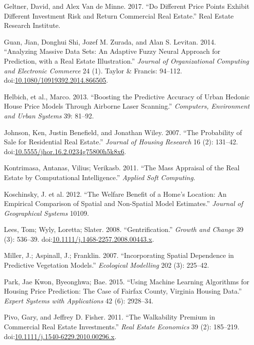 \documentclass[]{article}
\begin{document}
\hypertarget{ref-Geltner2017}{}
Geltner, David, and Alex Van de Minne. 2017. ``Do Different Price Points
Exhibit Different Investment Risk and Return Commercial Real Estate.''
Real Estate Research Institute.

\hypertarget{ref-Guan2014}{}
Guan, Jian, Donghui Shi, Jozef M. Zurada, and Alan S. Levitan. 2014.
``Analyzing Massive Data Sets: An Adaptive Fuzzy Neural Approach for
Prediction, with a Real Estate Illustration.'' \emph{Journal of
Organizational Computing and Electronic Commerce} 24 (1). Taylor \&
Francis: 94--112.
doi:\href{https://doi.org/10.1080/10919392.2014.866505}{10.1080/10919392.2014.866505}.

\hypertarget{ref-Helbich2013}{}
Helbich, et al., Marco. 2013. ``Boosting the Predictive Accuracy of
Urban Hedonic House Price Models Through Airborne Laser Scanning.''
\emph{Computers, Environment and Urban Systems} 39: 81--92.

\hypertarget{ref-Johnson2007}{}
Johnson, Ken, Justin Benefield, and Jonathan Wiley. 2007. ``The
Probability of Sale for Residential Real Estate.'' \emph{Journal of
Housing Research} 16 (2): 131--42.
doi:\href{https://doi.org/10.5555/jhor.16.2.0234g75800h5k8x6}{10.5555/jhor.16.2.0234g75800h5k8x6}.

\hypertarget{ref-Kontrimasa2011}{}
Kontrimasa, Antanas, Vilius; Verikasb. 2011. ``The Mass Appraisal of the
Real Estate by Computational Intelligence.'' \emph{Applied Soft
Computing}.

\hypertarget{ref-Koschinsky2012}{}
Koschinsky, J. et al. 2012. ``The Welfare Benefit of a Home's Location:
An Empirical Comparison of Spatial and Non-Spatial Model Estimates.''
\emph{Journal of Geographical Systems} 10109.

\hypertarget{ref-Lees2008}{}
Lees, Tom; Wyly, Loretta; Slater. 2008. ``Gentrification.'' \emph{Growth
and Change} 39 (3): 536--39.
doi:\href{https://doi.org/10.1111/j.1468-2257.2008.00443.x}{10.1111/j.1468-2257.2008.00443.x}.

\hypertarget{ref-Miller2015}{}
Miller, J.; Aspinall, J.; Franklin. 2007. ``Incorporating Spatial
Dependence in Predictive Vegetation Models.'' \emph{Ecological
Modelling} 202 (3): 225--42.

\hypertarget{ref-Park2015}{}
Park, Jae Kwon, Byeonghwa; Bae. 2015. ``Using Machine Learning
Algorithms for Housing Price Prediction: The Case of Fairfax County,
Virginia Housing Data.'' \emph{Expert Systems with Applications} 42 (6):
2928--34.

\hypertarget{ref-Pivo2011}{}
Pivo, Gary, and Jeffrey D. Fisher. 2011. ``The Walkability Premium in
Commercial Real Estate Investments.'' \emph{Real Estate Economics} 39
(2): 185--219.
doi:\href{https://doi.org/10.1111/j.1540-6229.2010.00296.x}{10.1111/j.1540-6229.2010.00296.x}.
\end{document}
